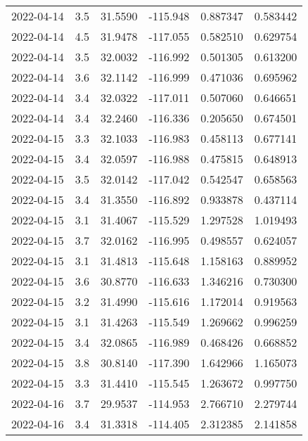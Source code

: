 \begin{tabular}{lrrrrr}
2022-04-14 &       3.5 &  31.5590 &  -115.948 &         0.887347 &         0.583442 \\
2022-04-14 &       4.5 &  31.9478 &  -117.055 &         0.582510 &         0.629754 \\
2022-04-14 &       3.5 &  32.0032 &  -116.992 &         0.501305 &         0.613200 \\
2022-04-14 &       3.6 &  32.1142 &  -116.999 &         0.471036 &         0.695962 \\
2022-04-14 &       3.4 &  32.0322 &  -117.011 &         0.507060 &         0.646651 \\
2022-04-14 &       3.4 &  32.2460 &  -116.336 &         0.205650 &         0.674501 \\
2022-04-15 &       3.3 &  32.1033 &  -116.983 &         0.458113 &         0.677141 \\
2022-04-15 &       3.4 &  32.0597 &  -116.988 &         0.475815 &         0.648913 \\
2022-04-15 &       3.5 &  32.0142 &  -117.042 &         0.542547 &         0.658563 \\
2022-04-15 &       3.4 &  31.3550 &  -116.892 &         0.933878 &         0.437114 \\
2022-04-15 &       3.1 &  31.4067 &  -115.529 &         1.297528 &         1.019493 \\
2022-04-15 &       3.7 &  32.0162 &  -116.995 &         0.498557 &         0.624057 \\
2022-04-15 &       3.1 &  31.4813 &  -115.648 &         1.158163 &         0.889952 \\
2022-04-15 &       3.6 &  30.8770 &  -116.633 &         1.346216 &         0.730300 \\
2022-04-15 &       3.2 &  31.4990 &  -115.616 &         1.172014 &         0.919563 \\
2022-04-15 &       3.1 &  31.4263 &  -115.549 &         1.269662 &         0.996259 \\
2022-04-15 &       3.4 &  32.0865 &  -116.989 &         0.468426 &         0.668852 \\
2022-04-15 &       3.8 &  30.8140 &  -117.390 &         1.642966 &         1.165073 \\
2022-04-15 &       3.3 &  31.4410 &  -115.545 &         1.263672 &         0.997750 \\
2022-04-16 &       3.7 &  29.9537 &  -114.953 &         2.766710 &         2.279744 \\
2022-04-16 &       3.4 &  31.3318 &  -114.405 &         2.312385 &         2.141858 \\

\end{tabular}
